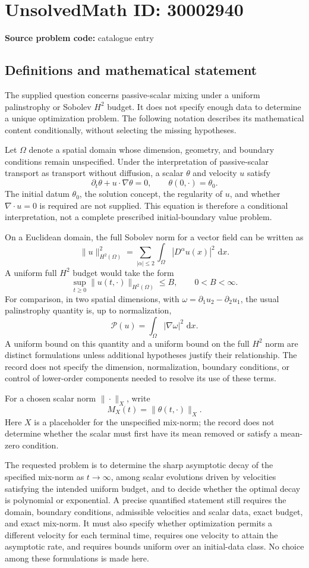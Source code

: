 \documentclass[11pt]{article}
\newcommand{\dd}{\,\mathrm{d}}
\begin{document}
\section*{UnsolvedMath ID: 30002940}
\textbf{Source problem code:} catalogue entry
\subsection{Definitions and mathematical statement}
The supplied question concerns passive-scalar mixing under a uniform palinstrophy or Sobolev \(H^2\) budget. It does not specify enough data to determine a unique optimization problem. The following notation describes its mathematical content conditionally, without selecting the missing hypotheses.

Let \(\Omega\) denote a spatial domain whose dimension, geometry, and boundary conditions remain unspecified. Under the interpretation of passive-scalar transport as transport without diffusion, a scalar \(\theta\) and velocity \(u\) satisfy
\[
\partial_t\theta+u\cdot\nabla\theta=0,
\qquad \theta(0,\cdot)=\theta_0.
\]
The initial datum \(\theta_0\), the solution concept, the regularity of \(u\), and whether \(\nabla\cdot u=0\) is required are not supplied. This equation is therefore a conditional interpretation, not a complete prescribed initial-boundary value problem.

On a Euclidean domain, the full Sobolev norm for a vector field can be written as
\[
\|u\|_{H^2(\Omega)}^2
=\sum_{|\alpha|\leq 2}\int_\Omega |D^\alpha u(x)|^2\,\dd x.
\]
A uniform full \(H^2\) budget would take the form
\[
\sup_{t\geq0}\|u(t,\cdot)\|_{H^2(\Omega)}\leq B,
\qquad 0<B<\infty.
\]
For comparison, in two spatial dimensions, with
\(\omega=\partial_1u_2-\partial_2u_1\), the usual palinstrophy quantity is, up to normalization,
\[
\mathcal P(u)=\int_\Omega |\nabla\omega|^2\,\dd x.
\]
A uniform bound on this quantity and a uniform bound on the full \(H^2\) norm are distinct formulations unless additional hypotheses justify their relationship. The record does not specify the dimension, normalization, boundary conditions, or control of lower-order components needed to resolve its use of these terms.

For a chosen scalar norm \(\|\cdot\|_X\), write
\[
M_X(t)=\|\theta(t,\cdot)\|_X.
\]
Here \(X\) is a placeholder for the unspecified mix-norm; the record does not determine whether the scalar must first have its mean removed or satisfy a mean-zero condition.

The requested problem is to determine the sharp asymptotic decay of the specified mix-norm as \(t\to\infty\), among scalar evolutions driven by velocities satisfying the intended uniform budget, and to decide whether the optimal decay is polynomial or exponential. A precise quantified statement still requires the domain, boundary conditions, admissible velocities and scalar data, exact budget, and exact mix-norm. It must also specify whether optimization permits a different velocity for each terminal time, requires one velocity to attain the asymptotic rate, and requires bounds uniform over an initial-data class. No choice among these formulations is made here.
\end{document}
